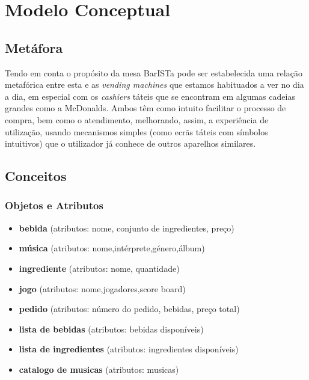 \documentclass{article}
\begin{document}
\section*{Modelo Conceptual}



\subsection*{Metáfora}
 Tendo em conta o propósito da mesa BarISTa pode ser estabelecida uma relação metafórica entre esta e as \textit{vending machines} que estamos habituados a ver no dia a dia, em especial com os \textit{cashiers} táteis que se encontram em algumas cadeias grandes como a McDonalds. Ambos têm como intuito facilitar o processo de compra, bem como o atendimento, melhorando, assim, a experiência de utilização, usando mecanismos simples (como ecrãs táteis com símbolos intuitivos) que o utilizador já conhece de outros aparelhos similares.

\subsection*{Conceitos}
\subsubsection*{Objetos e Atributos}
\begin{itemize}
\item\textbf{bebida} (atributos: nome, conjunto de ingredientes, preço)
\item\textbf{música} (atributos: nome,intérprete,género,álbum)
\item\textbf{ingrediente} (atributos: nome, quantidade)
\item\textbf{jogo} (atributos: nome,jogadores,score board)
\item\textbf{pedido} (atributos: número do pedido, bebidas, preço total)
\item\textbf{lista de bebidas} (atributos: bebidas disponíveis)
\item\textbf{lista de ingredientes} (atributos: ingredientes disponíveis)
\item\textbf{catalogo de musicas} (atributos: musicas)
\end{itemize}
\end{document}
